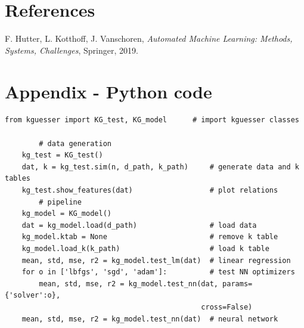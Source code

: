 \documentclass[a4paper,11pt]{article}
\begin{document}
\appendix

\section{References}
\begin{thebibliography}{9}
F. Hutter, L. Kotthoff, J. Vanschoren, \textit{Automated Machine Learning: Methods, Systems, Challenges}, Springer, 2019.
\end{thebibliography}

\section{Appendix - Python code} 
%
%
\begin{lstlisting}[caption={Operations}, label={lst:python_code}]
    from kguesser import KG_test, KG_model      # import kguesser classes

        # data generation
    kg_test = KG_test()
    dat, k = kg_test.sim(n, d_path, k_path)     # generate data and k tables
    kg_test.show_features(dat)                  # plot relations
        # pipeline
    kg_model = KG_model()
    dat = kg_model.load(d_path)                 # load data
    kg_model.ktab = None                        # remove k table
    kg_model.load_k(k_path)                     # load k table
    mean, std, mse, r2 = kg_model.test_lm(dat)  # linear regression
    for o in ['lbfgs', 'sgd', 'adam']:          # test NN optimizers
        mean, std, mse, r2 = kg_model.test_nn(dat, params={'solver':o}, 
                                              cross=False)
    mean, std, mse, r2 = kg_model.test_nn(dat)  # neural network
\end{lstlisting}
%

%

%
\end{document}
